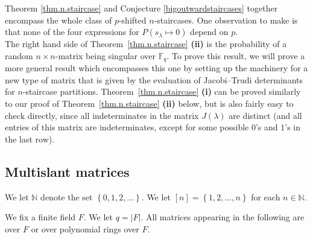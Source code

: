 \documentclass[numbers=enddot,12pt,final,onecolumn,notitlepage]{scrartcl}%
\theoremstyle{definition}
\newenvironment{noncompile}{}{}
\newcommand{\tup}[1]{\left( #1 \right)}
\theoremstyle{plainsl}
\begin{document}
Theorem \ref{thm.n.staircase} and Conjecture \ref{bigoutwardstaircases} together encompass the whole class of $p$-shifted $n$-staircases. One observation to make is that none of the four expressions for $P(s_{\lambda} \longmapsto 0)$ depend on $p$. \\

The right hand side of Theorem~\ref{thm.n.staircase} \textbf{(ii)}
is the probability of a random $n\times n$-matrix being singular over $\mathbb{F}_q$. To prove this result, we will prove a more general result which encompasses this one by setting up the machinery for a new type of matrix that is given by the evaluation of Jacobi--Trudi determinants for $n$-staircase partitions.  
Theorem~\ref{thm.n.staircase} \textbf{(i)} can be proved similarly to our proof of Theorem~\ref{thm.n.staircase} \textbf{(ii)} below,
but is also fairly easy to check directly, since all indeterminates
in the matrix $J\tup{\lambda}$ are distinct (and all entries of this
matrix are indeterminates, except for some possible $0$'s and $1$'s
in the last row).



\subsection{Multislant matrices}

We let $\mathbb{N}$ denote the set $\left\{  0,1,2,\ldots\right\}  $. We let
$\left[  n\right]  =\left\{  1,2,\ldots,n\right\}  $ for each $n\in\mathbb{N}$.

We fix a finite field $F$. We let $q=\left\vert F\right\vert $. All matrices
appearing in the following are over $F$ or over polynomial rings over $F$.

\end{document}
